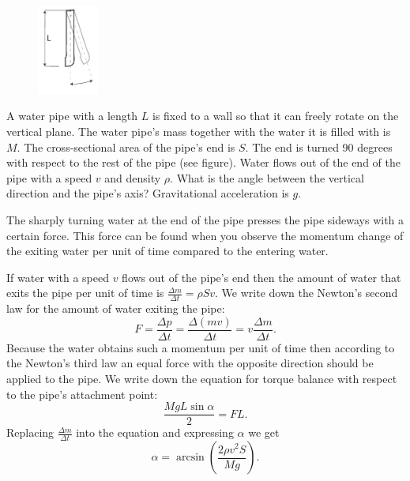 \begin{figure}
  \vspace{-35pt}
  \begin{center}
    \includegraphics[width=0.18\textwidth]{2015-v2g-05-toru}
  \end{center}
  \vspace*{-10pt}
\end{figure}
A water pipe with a length $L$ is fixed to a wall so that it can freely rotate on the vertical plane. The water pipe’s mass together with the water it is filled with is $M$. The cross-sectional area of the pipe’s end is $S$. The end is turned 90 degrees with respect to the rest of the pipe (see figure). Water flows out of the end of the pipe with a speed $v$ and density $\rho$. What is the angle between the vertical direction and the pipe’s axis? Gravitational acceleration is $g$.

\hinteng
The sharply turning water at the end of the pipe presses the pipe sideways with a certain force. This force can be found when you observe the momentum change of the exiting water per unit of time compared to the entering water.

\solueng
If water with a speed $v$ flows out of the pipe’s end then the amount of water that exits the pipe per unit of time is $\frac{\Delta m}{\Delta t}=\rho S v$. We write down the Newton’s second law for the amount of water exiting the pipe:
\[ F=\frac{\Delta p}{\Delta t}=\frac{\Delta(mv)}{\Delta t}=v \frac{\Delta m}{\Delta t}. \] 
Because the water obtains such a momentum per unit of time then according to the Newton’s third law an equal force with the opposite direction should be applied to the pipe. We write down the equation for torque balance with respect to the pipe’s attachment point:
\[ \frac{MgL\sin \alpha}{2}=FL. \] 
Replacing $\frac{\Delta m}{\Delta t}$ into the equation and expressing $\alpha$ we get
\[ \alpha=\arcsin (\frac{2\rho v^2 S}{Mg}). \]
\probend